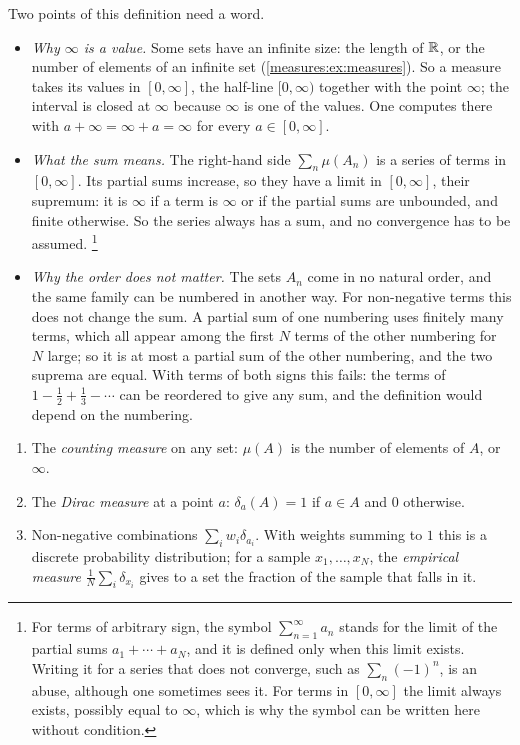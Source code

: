 \begin{notechapter}
Two points of this definition need a word.
\begin{itemize}[nosep]
  \item \emph{Why $\infty$ is a value.} Some sets have an infinite
        size: the length of $\mathbb{R}$, or the number of elements of an
        infinite set (\cref{measures:ex:measures}). So a measure takes
        its values in $[0, \infty]$, the half-line $[0, \infty)$
        together with the point $\infty$; the interval is closed at
        $\infty$ because $\infty$ is one of the values. One computes
        there with $a + \infty = \infty + a = \infty$ for every
        $a\in[0, \infty]$.
  \item \emph{What the sum means.} The right-hand side
        $\sum_n\mu(A_n)$ is a series of terms in $[0, \infty]$. Its
        partial sums increase, so they have a limit in $[0, \infty]$,
        their supremum: it is $\infty$ if a term is $\infty$ or if the
        partial sums are unbounded, and finite otherwise. So the series
        always has a sum, and no convergence has to be assumed.%
        \footnote{For terms of arbitrary sign, the symbol
        $\sum_{n=1}^\infty a_n$ stands for the limit of the partial
        sums $a_1 + \cdots + a_N$, and it is defined only when this
        limit exists. Writing it for a series that does not converge,
        such as $\sum_n(-1)^n$, is an abuse, although one sometimes
        sees it. For terms in $[0, \infty]$ the limit always exists,
        possibly equal to $\infty$, which is why the symbol can be
        written here without condition.}
  \item \emph{Why the order does not matter.} The sets $A_n$ come in
        no natural order, and the same family can be numbered in
        another way. For non-negative terms this does not change the
        sum. A partial sum of one numbering uses finitely many terms,
        which all appear among the first $N$ terms of the other
        numbering for $N$ large; so it is at most a partial sum of the
        other numbering, and the two suprema are equal. With terms of
        both signs this fails: the terms of
        $1 - \frac12 + \frac13 - \cdots$ can be reordered to give any
        sum, and the definition would depend on the numbering.
\end{itemize}

\begin{example}\label{measures:ex:measures}
\begin{enumerate}[nosep]
  \item The \emph{counting measure} on any set: $\mu(A)$ is the number
        of elements of $A$, or $\infty$.
  \item The \emph{Dirac measure} at a point $a$: $\delta_a(A) = 1$ if
        $a\in A$ and $0$ otherwise.
  \item Non-negative combinations $\sum_iw_i\delta_{a_i}$. With weights
        summing to $1$ this is a discrete probability distribution; for
        a sample $x_1,\dots,x_N$, the \emph{empirical measure}
        $\frac1N\sum_i\delta_{x_i}$ gives to a set the fraction of the
        sample that falls in it.
\end{enumerate}
\end{example}


\end{notechapter}
